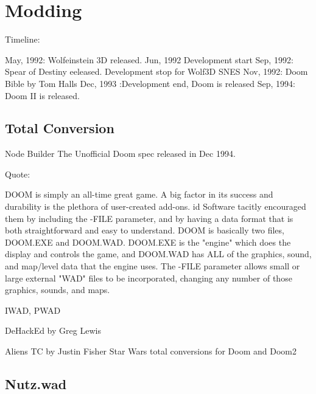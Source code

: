 \section{Modding}

\par
Timeline:

May, 1992: Wolfeinstein 3D released.
Jun, 1992 Development start
Sep, 1992: Spear of Destiny eeleased.
Development stop for Wolf3D SNES
Nov, 1992: Doom Bible by Tom Halls
Dec, 1993 :Development end, Doom is released
Sep, 1994: Doom II is released.


\subsection{Total Conversion}


Node Builder
The Unofficial Doom spec released in Dec 1994. 

Quote:

DOOM is simply an all-time great game. A big factor in its success
and durability is the plethora of user-created add-ons. id Software
tacitly encouraged them by including the -FILE parameter, and by having
a data format that is both straightforward and easy to understand.
DOOM is basically two files, DOOM.EXE and DOOM.WAD. DOOM.EXE is the
"engine" which does the display and controls the game, and DOOM.WAD has
ALL of the graphics, sound, and map/level data that the engine uses.
The -FILE parameter allows small or large external "WAD" files to be
incorporated, changing any number of those graphics, sounds, and maps.

IWAD, PWAD


DeHackEd by Greg Lewis


Aliens TC by Justin Fisher
Star Wars total conversions for Doom and Doom2

\subsection{Nutz.wad}

